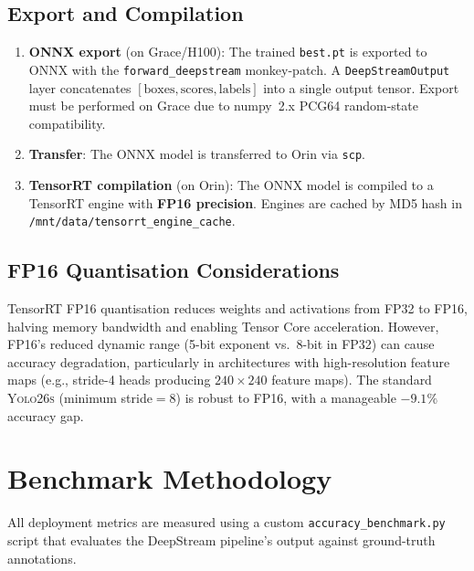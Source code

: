 \documentclass[12pt, titlepage]{article}
\begin{document}
\subsection{Export and Compilation}

\begin{enumerate}[leftmargin=*]
  \item \textbf{ONNX export} (on Grace/H100): The trained
        \texttt{best.pt} is exported to ONNX with the
        \texttt{forward\_deepstream} monkey-patch.  A
        \texttt{DeepStreamOutput} layer concatenates
        $[\text{boxes}, \text{scores}, \text{labels}]$ into a single
        output tensor.  Export must be performed on Grace due to
        numpy~2.x PCG64 random-state compatibility.
  \item \textbf{Transfer}: The ONNX model is transferred to Orin via
        \texttt{scp}.
  \item \textbf{TensorRT compilation} (on Orin): The ONNX model is
        compiled to a TensorRT engine with \textbf{FP16 precision}.
        Engines are cached by MD5 hash in
        \texttt{/mnt/data/tensorrt\_engine\_cache}.
\end{enumerate}

\subsection{FP16 Quantisation Considerations}

TensorRT FP16 quantisation reduces weights and activations from FP32 to FP16,
halving memory bandwidth and enabling Tensor Core acceleration. However, FP16's
reduced dynamic range (5-bit exponent vs.\ 8-bit in FP32) can cause accuracy
degradation, particularly in architectures with high-resolution feature maps
(e.g., stride-4 heads producing $240{\times}240$ feature maps). The standard
\textsc{Yolo26s} (minimum stride$=8$) is robust to FP16, with a manageable
$-9.1\%$ accuracy gap.

\section{Benchmark Methodology}
\label{sec:benchmark}

All deployment metrics are measured using a custom
\texttt{accuracy\_benchmark.py} script that evaluates the DeepStream pipeline's
output against ground-truth annotations.
\end{document}
